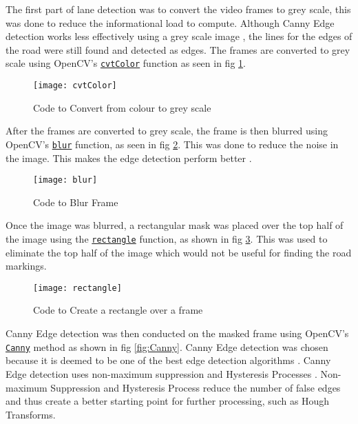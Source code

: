 \documentclass[conference]{IEEEtran}
\begin{document}
The first part of lane detection was to convert the video frames to grey scale, this was done to reduce the informational load to compute. Although Canny Edge detection works less effectively using a grey scale image \cite{Canny_On_Grey}, the lines for the edges of the road were still found and detected as edges. The frames are converted to grey scale using OpenCV's \href{https://docs.opencv.org/4.x/d8/d01/group__imgproc__color__conversions.html#ga397ae87e1288a81d2363b61574eb8cab}{\texttt{cvtColor}} function as seen in fig \ref{fig:cvtColor}.

\begin{figure}[H]
\centerline{\texttt{[image: cvtColor]}}
\caption{Code to Convert from colour to grey scale}
\label{fig:cvtColor}
\end{figure}

After the frames are converted to grey scale, the frame is then blurred using OpenCV's \href{https://docs.opencv.org/4.x/d4/d86/group__imgproc__filter.html#ga8c45db9afe636703801b0b2e440fce37}{\texttt{blur}} function, as seen in fig \ref{fig:blur}. This was done to reduce the noise in the image. This makes the edge detection perform better \cite{Image_Blurring}.

\begin{figure}[H]
\centerline{\texttt{[image: blur]}}
\caption{Code to Blur Frame}
\label{fig:blur}
\end{figure} 

Once the image was blurred, a rectangular mask was placed over the top half of the image using the \href{https://docs.opencv.org/4.x/d6/d6e/group__imgproc__draw.html#ga07d2f74cadcf8e305e810ce8eed13bc9}{\texttt{rectangle}} function, as shown in fig \ref{fig:rectangle}. This was used to eliminate the top half of the image which would not be useful for finding the road markings. 

\begin{figure}[H]
\centerline{\texttt{[image: rectangle]}}
\caption{Code to Create a rectangle over a frame}
\label{fig:rectangle}
\end{figure}
 
Canny Edge detection was then conducted on the masked frame using OpenCV's \href{https://docs.opencv.org/4.x/dd/d1a/group__imgproc__feature.html#ga04723e007ed888ddf11d9ba04e2232de}{\texttt{Canny}} method as shown in fig \ref{fig:Canny}. Canny Edge detection was chosen because it is deemed to be one of the best edge detection algorithms \cite{Canny2009CannyED}. Canny Edge detection uses non-maximum suppression \cite{non-maximum_supression} and Hysteresis Processes \cite{Hysteresis_Thresholding}. Non-maximum Suppression and Hysteresis Process reduce the number of false edges and thus create a better starting point for further processing, such as Hough Transforms. 
\end{document}
